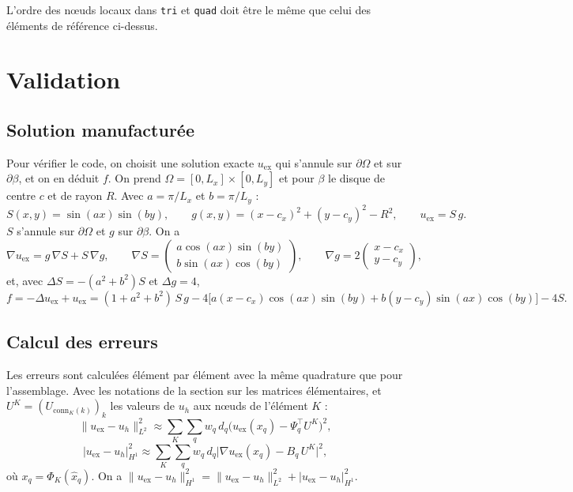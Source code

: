 \documentclass[11pt,a4paper]{article}
\begin{document}
L'ordre des nœuds locaux dans \texttt{tri} et \texttt{quad} doit être le
même que celui des éléments de référence ci-dessus.

\section{Validation}
\label{sec:validation}

\subsection{Solution manufacturée}

Pour vérifier le code, on choisit une solution exacte $u_{\mathrm{ex}}$ qui
s'annule sur $\partial\Omega$ et sur $\partial\beta$, et on en déduit $f$.
On prend $\Omega = [0, L_x] \times [0, L_y]$ et pour $\beta$ le disque de
centre $c$ et de rayon $R$. Avec $a = \pi / L_x$ et $b = \pi / L_y$ :
\[
S(x,y) = \sin(a x)\sin(b y),
\qquad
g(x,y) = (x - c_x)^2 + (y - c_y)^2 - R^2,
\qquad
u_{\mathrm{ex}} = S\, g .
\]
$S$ s'annule sur $\partial\Omega$ et $g$ sur $\partial\beta$. On a
\[
\nabla u_{\mathrm{ex}} = g\, \nabla S + S\, \nabla g,
\qquad
\nabla S = \begin{pmatrix} a \cos(a x)\sin(b y) \\ b \sin(a x)\cos(b y) \end{pmatrix},
\qquad
\nabla g = 2 \begin{pmatrix} x - c_x \\ y - c_y \end{pmatrix},
\]
et, avec $\Delta S = -(a^2 + b^2) S$ et $\Delta g = 4$,
\[
f = -\Delta u_{\mathrm{ex}} + u_{\mathrm{ex}}
= (1 + a^2 + b^2)\, S\, g
- 4\big[ a (x - c_x) \cos(a x)\sin(b y) + b (y - c_y) \sin(a x)\cos(b y) \big]
- 4 S .
\]

\subsection{Calcul des erreurs}

Les erreurs sont calculées élément par élément avec la même quadrature que
pour l'assemblage. Avec les notations de la section sur les matrices
élémentaires, et $U^K = (U_{\mathrm{conn}_K(k)})_{k}$ les valeurs de $u_h$
aux nœuds de l'élément $K$ :
\[
\|u_{\mathrm{ex}} - u_h\|_{L^2}^2
\approx \sum_{K} \sum_{q} w_q\, d_q
\Big( u_{\mathrm{ex}}(x_q) - \Psi_q^{\top} U^K \Big)^2 ,
\]
\[
|u_{\mathrm{ex}} - u_h|_{H^1}^2
\approx \sum_{K} \sum_{q} w_q\, d_q
\Big| \nabla u_{\mathrm{ex}}(x_q) - B_q\, U^K \Big|^2 ,
\]
où $x_q = \Phi_K(\hat{x}_q)$. On a
$\|u_{\mathrm{ex}} - u_h\|_{H^1}^2 = \|u_{\mathrm{ex}} - u_h\|_{L^2}^2
+ |u_{\mathrm{ex}} - u_h|_{H^1}^2$.
\end{document}
